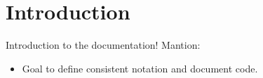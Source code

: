 \section{Introduction}

Introduction to the documentation!
Mantion:
\begin{itemize}
  \item Goal to define consistent notation and document code.
\end{itemize}
